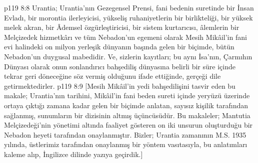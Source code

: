 \vs p119 8:8 Urantia; Urantia’nın Gezegensel Prensi, fani bedenin suretinde bir İnsan Evladı, bir morontia ilerleyicisi, yükseliş ruhaniyetlerin bir birlikteliği, bir yüksek melek akran, bir Âdemsel özgürleştiricisi, bir sistem kurtarıcısı, âlemlerin bir Melçizedek hizmetkârı ve tüm Nebadon’un egemeni olarak Mesih Mikâil’in fani evi halindeki on milyon yerleşik dünyanın başında gelen bir biçimde, bütün Nebadon’un duygusal mabedidir. Ve, sizlerin kayıtları; bu aynı İsa’nın, Çarmıhın Dünyası olarak onun sonlandırıcı bahşediliş dünyasına belirli bir süre içinde tekrar geri döneceğine söz vermiş olduğunu ifade ettiğinde, gerçeği dile getirmektedirler.
\separatorline
\vs p119 8:9 [Mesih Mikâil’in yedi bahşedilişini tasvir eden bu makale; Urantia’nın tarihini, Mikâil’in fani beden sureti içinde yeryüzü üzerinde ortaya çıktığı zamana kadar gelen bir biçimde anlatan, sayısız kişilik tarafından sağlanmış, sunumların bir dizisinin altmış üçüncüsüdür. Bu makaleler; Mantutia Melçizedeği’nin yönetimi altında faaliyet gösteren on iki unsurun oluşturduğu bir Nebadon heyeti tarafından onaylanmıştır. Bizler; Urantia zamanının M.S. 1935 yılında, üstlerimiz tarafından onaylanmış bir yöntem vasıtasıyla, bu anlatımları kaleme alıp, İngilizce dilinde yazıya geçirdik.]
